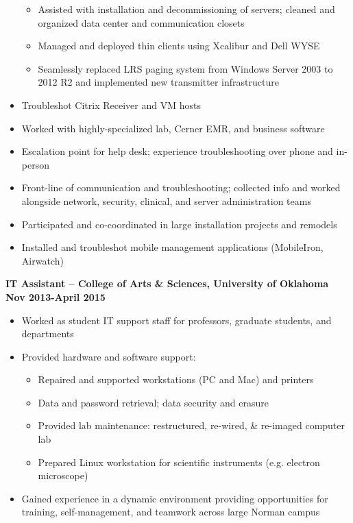 \documentclass[line]{res}
\begin{document}
\begin{resume}
\begin{itemize}
			\begin{itemize}
				\item Assisted with installation and decommissioning of servers; cleaned and organized data center and communication closets
				\item Managed and deployed thin clients using Xcalibur and Dell WYSE
				\item Seamlessly replaced LRS paging system from Windows Server 2003 to 2012 R2 and implemented new transmitter infrastructure
			\end{itemize}
		\item Troubleshot Citrix Receiver and VM hosts
		\item Worked with highly-specialized lab, Cerner EMR, and business software
		\item Escalation point for help desk; experience troubleshooting over phone and in-person
		\item Front-line of communication and troubleshooting; collected info and worked alongside network, security, clinical, and server administration teams
		\item Participated and co-coordinated in large installation projects and remodels
		\item Installed and troubleshot mobile management applications (MobileIron, Airwatch)
	\end{itemize}
\textbf{IT Assistant -- College of Arts \& Sciences, University of Oklahoma}
\newline
\textbf{Nov 2013-April 2015}
\begin{itemize}
	\item Worked as student IT support staff for professors, graduate students, and departments
	\item Provided hardware and software support:
		\begin{itemize}
			\item Repaired and supported workstations (PC and Mac) and printers
			\item Data and password retrieval; data security and erasure
			\item Provided lab maintenance: restructured, re-wired, \& re-imaged computer lab
			\item Prepared Linux workstation for scientific instruments (e.g. electron microscope)
		\end{itemize}
	\item Gained experience in a dynamic environment providing opportunities for training, self-management, and teamwork across large Norman campus
\end{itemize}



\end{resume}
\end{document}
